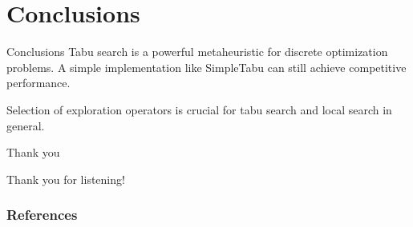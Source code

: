 \documentclass[9pt]{beamer}
\begin{document}
\section{Conclusions}
\begin{frame}{Conclusions}
Tabu search is a powerful metaheuristic for discrete optimization problems.
A simple implementation like SimpleTabu can still achieve competitive performance.

Selection of exploration operators is crucial for tabu search and local search in general.
\end{frame}

\begin{frame}{Thank you}
    \begin{center}
        \Huge{Thank you for listening!}
    \end{center}
\end{frame}

\begin{frame}[allowframebreaks]
    \frametitle{References}
    
    
\end{frame}
\end{document}
